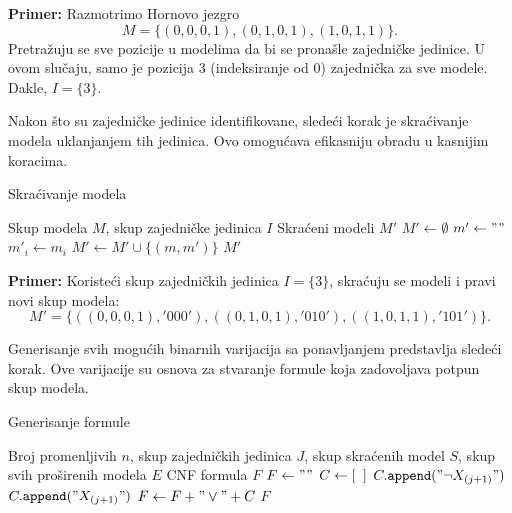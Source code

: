 \documentclass[12pt,oneside]{memoir}
\begin{document}
\textbf{Primer:} Razmotrimo Hornovo jezgro 
\[
M = \{(0, 0, 0, 1), (0, 1, 0, 1), (1, 0, 1, 1)\}\text{.}
\]
Pretražuju se sve pozicije u modelima da bi se pronašle zajedničke jedinice. U ovom slučaju, samo je pozicija 3 (indeksiranje od 0) zajednička za sve modele. Dakle, $I = \{3\} $.


Nakon što su zajedničke jedinice identifikovane, sledeći korak je skraćivanje modela uklanjanjem tih jedinica. Ovo omogućava efikasniju obradu u kasnijim koracima.\\

\begin{algorithm}[H]
\caption{Skraćivanje modela}
\renewcommand{\algorithmicrequire}{\textbf{Ulaz:}}
\renewcommand{\algorithmicensure}{\textbf{Izlaz:}}
\begin{algorithmic}[1]
\REQUIRE Skup modela $M$, skup zajedničke jedinica $I$
\ENSURE Skraćeni modeli $M'$
\STATE $M' \gets \emptyset$
    \STATE $m' \gets ""$
            \STATE $m'_i \gets m_i$
        \ENDIF
    \ENDFOR
    \STATE $M' \gets M' \cup \{(m, m')\}$
\ENDFOR
\RETURN $M'$
\end{algorithmic}
\end{algorithm}

\textbf{Primer:} Koristeći skup zajedničkih jedinica $ I = \{3\} $, skraćuju se modeli i pravi novi skup modela:
\[
M' = \{((0, 0, 0, 1), '000'), ((0, 1, 0, 1), '010'), ((1, 0, 1, 1), '101')\}\text{.}
\] 

Generisanje svih mogućih binarnih varijacija sa ponavljanjem predstavlja sledeći korak. Ove varijacije su osnova za stvaranje formule koja zadovoljava potpun skup modela.\\

\begin{algorithm}[H]
\caption{Generisanje formule}
\renewcommand{\algorithmicrequire}{\textbf{Ulaz:}}
\renewcommand{\algorithmicensure}{\textbf{Izlaz:}}
\begin{algorithmic}[1]
\REQUIRE Broj promenljivih $n$, skup zajedničkih jedinica $J$, skup skraćenih model $S$, skup svih proširenih modela $E$
\ENSURE CNF formula $F$
\STATE $F \gets ""$
        \STATE $C \gets [\texttt{ \phantom{}}]$ 
                    \STATE $C.\texttt{append}("\neg X_{(j + 1)}")$
                \ELSE
                    \STATE $C.\texttt{append}("X_{(j + 1)}")$
                \ENDIF
            \ENDIF
        \ENDFOR
        \STATE $F \gets F + "\vee" + C$
    \ENDIF
\ENDFOR
\RETURN $F$
\end{algorithmic}
\end{algorithm}
\end{document}
